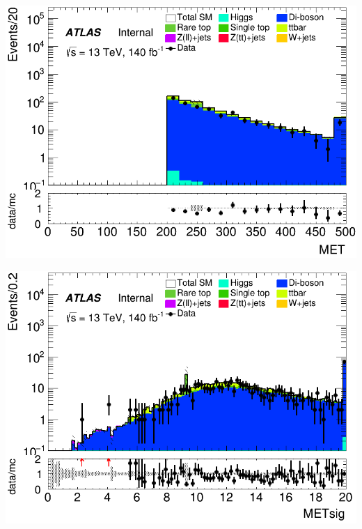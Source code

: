 \documentclass[usenames,dvipsnames]{beamer}
\begin{document}
\begin{frame}
    \vspace{0.5cm} %

    \begin{minipage}{0.32\textwidth}
        \centering
        \includegraphics[width=\textwidth]{graphics/LLL_met/LLL_met_MET.png}
    \end{minipage}
    \hfill
    \begin{minipage}{0.32\textwidth}
        \centering
        \includegraphics[width=\textwidth]{graphics/LLL_met/LLL_met_METsig.png}
    \end{minipage}
    \hfill
    

\end{frame}
\end{document}
